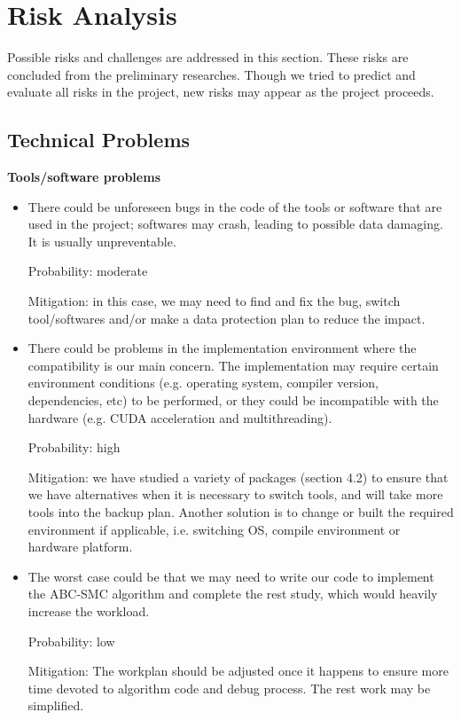 \documentclass{article}
\begin{document}
\section{Risk Analysis}

Possible risks and challenges are addressed in this section. These risks are concluded from the preliminary researches. Though we tried to predict and evaluate all risks in the project, new risks may appear as the project proceeds.

\subsection{Technical Problems}

\textbf{Tools/software problems} 

\begin{itemize}
	\item There could be unforeseen bugs in the code of the tools or software that are used in the project; softwares may crash, leading to possible data damaging. It is usually unpreventable. 

	Probability: moderate
	
	Mitigation: in this case, we may need to find and fix the bug, switch tool/softwares and/or make a data protection plan to reduce the impact.
	
	\item There could be problems in the implementation environment where the compatibility is our main concern. The implementation may require certain environment conditions (e.g. operating system, compiler version, dependencies, etc) to be performed, or they could be incompatible with the hardware (e.g. CUDA acceleration and multithreading). 
	
	Probability: high
	
	Mitigation: we have studied a variety of packages (section 4.2) to ensure that we have alternatives when it is necessary to switch tools, and will take more tools into the backup plan. Another solution is to change or built the required environment if applicable, i.e. switching OS, compile environment or hardware platform.

	\item The worst case could be that we may need to write our code to implement the ABC-SMC algorithm and complete the rest study, which would heavily increase the workload.
	
	Probability: low
	
	Mitigation: The workplan should be adjusted once it happens to ensure more time devoted to algorithm code and debug process. The rest work may be simplified.

\end{itemize}
\end{document}
